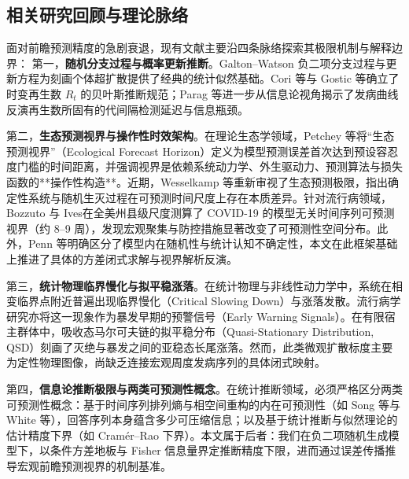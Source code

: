 \documentclass[10pt,a4paper]{article}
\theoremstyle{plain}
\theoremstyle{definition}
\begin{document}
\subsection{相关研究回顾与理论脉络}

面对前瞻预测精度的急剧衰退，现有文献主要沿四条脉络探索其极限机制与解释边界：
第一，\textbf{随机分支过程与概率更新推断}。Galton--Watson 负二项分支过程\citep{athreya1972branching}与更新方程为刻画个体超扩散提供了经典的统计似然基础\citep{lloyd-smith2005superspreading}。Cori 等\citep{cori2013framework}与 Gostic 等\citep{gostic2020practical}确立了时变再生数 $R_t$ 的贝叶斯推断规范；Parag 等\citep{parag2020information, parag2022fundamental, parag2022quantifying}进一步从信息论视角揭示了发病曲线反演再生数所固有的代间隔检测延迟与信息瓶颈。

第二，\textbf{生态预测视界与操作性时效架构}。在理论生态学领域，Petchey 等\citep{petchey2015ecological}将“生态预测视界”（Ecological Forecast Horizon）定义为模型预测误差首次达到预设容忍度门槛的时间距离，并强调视界是依赖系统动力学、外生驱动力、预测算法与损失函数的**操作性构造**。近期，Wesselkamp 等\citep{wesselkamp2025forecast}重新审视了生态预测极限，指出确定性系统与随机生灭过程在可预测时间尺度上存在本质差异。针对流行病领域，Bozzuto 与 Ives\citep{bozzuto2023differences}在全美州县级尺度测算了 COVID-19 的模型无关时间序列可预测视界（约 8--9 周），发现宏观聚集与防控措施显著改变了可预测性空间分布。此外，Penn 等\citep{penn2023intrinsic}明确区分了模型内在随机性与统计认知不确定性，本文在此框架基础上推进了具体的方差闭式求解与视界解析反演。

第三，\textbf{统计物理临界慢化与拟平稳涨落}。在统计物理与非线性动力学中，系统在相变临界点附近普遍出现临界慢化（Critical Slowing Down）与涨落发散\citep{grassberger1983critical}。流行病学研究亦将这一现象作为暴发早期的预警信号（Early Warning Signals）\citep{oregan2013theory, southall2021early}。在有限宿主群体中，吸收态马尔可夫链的拟平稳分布（Quasi-Stationary Distribution, QSD）刻画了灭绝与暴发之间的亚稳态长尾涨落\citep{darroch1965quasi, nasell1999quasi, dolgoarshinnykh2006critical}。然而，此类微观扩散标度主要为定性物理图像，尚缺乏连接宏观周度发病序列的具体闭式映射。

第四，\textbf{信息论推断极限与两类可预测性概念}。在统计推断领域，必须严格区分两类可预测性概念：基于时间序列排列熵与相空间重构的内在可预测性（如 Song 等\citep{song2010limits}与 White 等\citep{white2026forecastability}），回答序列本身蕴含多少可压缩信息；以及基于统计推断与似然理论的估计精度下界（如 Cramér--Rao 下界）\citep{parag2022fundamental}。本文属于后者：我们在负二项随机生成模型下，以条件方差地板与 Fisher 信息量界定推断精度下限，进而通过误差传播推导宏观前瞻预测视界的机制基准。
\end{document}
